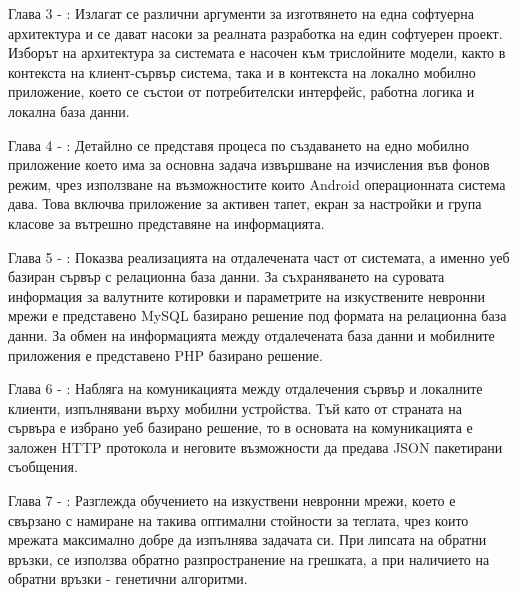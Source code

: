 Глава 3 - : Излагат се различни аргументи за изготвянето на една софтуерна архитектура и се дават насоки за реалната разработка на един софтуерен проект. Изборът на архитектура за системата е насочен към трислойните модели, както в контекста на клиент-сървър система, така и в контекста на локално мобилно приложение, което се състои от потребителски интерфейс, работна логика и локална база данни. 

Глава 4 - : Детайлно се представя процеса по създаването на едно мобилно приложение което има за основна задача извършване на изчисления във фонов режим, чрез използване на възможностите които Android операционната система дава. Това включва приложение за активен тапет, екран за настройки и група класове за вътрешно представяне на информацията. 

Глава 5 - : Показва реализацията на отдалечената част от системата, а именно уеб базиран сървър с релационна база данни. За съхраняването на суровата информация за валутните котировки и параметрите на изкуствените невронни мрежи е представено MySQL базирано решение под формата на релационна база данни. За обмен на информацията между отдалечената база данни и мобилните приложения е представено PHP базирано решение. 

Глава 6 - : Набляга на комуникацията между отдалечения сървър и локалните клиенти, изпълнявани върху мобилни устройства. Тъй като от страната на сървъра е избрано уеб базирано решение, то в основата на комуникацията е заложен HTTP протокола и неговите възможности да предава JSON пакетирани съобщения. 

Глава 7 - : Разглежда обучението на изкуствени невронни мрежи, което е свързано с намиране на такива оптимални стойности за теглата, чрез които мрежата максимално добре да изпълнява задачата си. При липсата на обратни връзки, се използва обратно разпространение на грешката, а при наличието на обратни връзки - генетични алгоритми. 